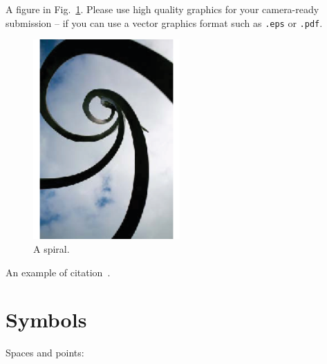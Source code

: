 \documentclass[wcp]{jmlr}
\newcommand{\1}{\mathbbm{1}}
\begin{document}
A figure in Fig.~\ref{fig:spiral}. Please use high quality graphics
for your camera-ready submission -- if you can use a vector graphics
format such as \texttt{.eps} or \texttt{.pdf}.
\begin{figure}[htp]
\begin{center}
\includegraphics[width=0.5\textwidth]{spiral.eps}
\caption{A spiral.}\label{fig:spiral}
\end{center}
\end{figure}

An example of citation~\cite{DBLP:conf/acml/2009}.

\newpage


%

\newpage

\appendix

\section{Symbols}\label{apd:symbols}

Spaces and points:
\end{document}

